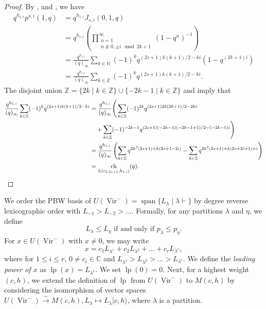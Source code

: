 \documentclass[a4paper, 12pt, reqno]{amsart}
\theoremstyle{remark}
\DeclareMathOperator{\Vir}{Vir}
\DeclareMathOperator{\ch}{ch}
\DeclareMathOperator{\vspan}{span}
\DeclareMathOperator{\lp}{lp}
\begin{document}
\begin{proof}
  By , \cite[Lemma 7.3]{andrews_theory_1998} and \cite[Corollary 2.9]{andrews_theory_1998}, we have
  \begin{align*}
    q^{h_{1, i}}p^{s, i}(1, q) &= q^{h_{1, i}}J_{s, i}(0, 1, q) \\
                               &= q^{h_{1, i}}\left(\prod^{\infty}_{\substack{n = 1 \\ n \not\equiv 0, \pm i \mod 2k + 1}}(1 - q^n)^{-1}\right) \\
                               &= \frac{q^{h_{1, i}}}{(q)_{\infty}}\sum_{k \in \mathbb{N}}(-1)^kq^{(2s + 1)k(k + 1)/2 - ki}(1 - q^{(2k + 1)i}) \\
                               &= \frac{q^{h_{1, i}}}{(q)_{\infty}}\sum_{k \in \mathbb{Z}}(-1)^kq^{(2s + 1)k(k + 1)/2 - ki}.
  \end{align*}
  The disjoint union $\mathbb{Z} = \{2k \mid k \in \mathbb{Z}\} \cup \{-2k - 1 \mid k \in \mathbb{Z}\}$ and  imply that
  \begin{align*}
    \frac{q^{h_{1, i}}}{(q)_{\infty}}\sum_{k \in \mathbb{Z}}(-1)^kq^{(2s + 1)k(k + 1)/2 - ki} &= \frac{q^{h_{1, i}}}{(q)_{\infty}}\Bigg(\sum_{k \in \mathbb{Z}}(-1)^{2k}q^{(2s + 1)2k(2k + 1)/2 - 2ki} \\
                                                                                              &\quad + \sum_{k \in \mathbb{Z}}(-1)^{-2k - 1}q^{(2s + 1)(-2k - 1)(-2k - 1 + 1)/2 - (-2k - 1)i}\Bigg) \\
                                                                                              &= \frac{q^{h_{1, i}}}{(q)_{\infty}}\left(\sum_{k \in \mathbb{Z}}q^{2k^2(2s + 1) + k(2s + 1 - 2i)} - \sum_{k \in \mathbb{Z}}q^{2k^2(2s + 1) + k(2s + 2i + 1) + i}\right) \\
                                                                                              &= \ch_{L(c_{2, 2s + 1}, h_{1, i})}(q). \qedhere
  \end{align*}
\end{proof}

We order the PBW basis of $U(\Vir^-) = \vspan\{L_{\lambda} \mid \lambda \vdash\}$ by degree reverse lexicographic order with $L_{-1} > L_{-2} > \dots$.
Formally, for any partitions $\lambda$ and $\eta$, we define
\begin{equation*}
  L_{\lambda} \le L_{\eta}\text{ if and only if }p_{\lambda} \le p_{\eta}.
\end{equation*}
For $x \in U(\Vir^-)$ with $x \neq 0$, we may write
\begin{equation*}
  x = c_1L_{\lambda^1} + c_2L_{\lambda^2} + \dots + c_rL_{\lambda^r},
\end{equation*}
where for $1 \le i \le r$, $0 \neq c_i \in \mathbb{C}$ and $L_{\lambda^1} > L_{\lambda^2} > \dots > L_{\lambda^r}$.
We define the \emph{leading power of $x$} as $\lp(x) = L_{\lambda^1}$.
We set $\lp(0) = 0$.
Next, for a highest weight $(c, h)$, we extend the definition of $\lp$ from $U(\Vir^-)$ to $M(c, h)$ by considering the isomorphism of vector spaces $U(\Vir^-) \xrightarrow{\sim} M(c, h), L_{\lambda} \mapsto L_{\lambda}|c, h\rangle$, where $\lambda$ is a partition.
\end{document}
